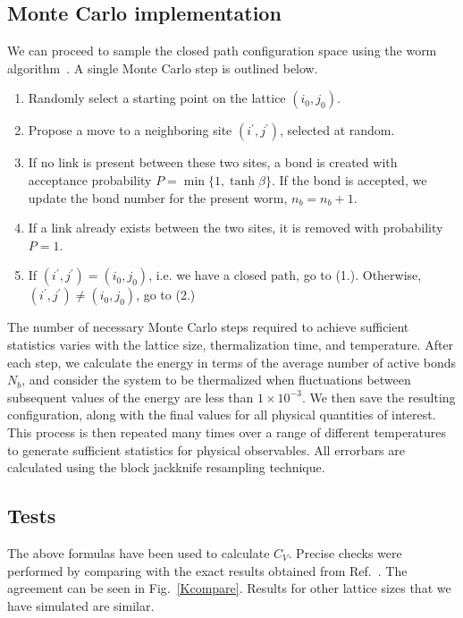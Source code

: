 \documentclass[../main.tex]{subfiles}
\begin{document}
\subsection{Monte Carlo implementation}%
\label{ssec:monte_carlo_implementation}
We can proceed to sample the closed path configuration space using the worm algorithm~\cite{prok87}. A single Monte
Carlo step is outlined below.
\begin{enumerate}
    \item Randomly select a starting point on the lattice $(i_0, j_0)$.
    \item Propose a move to a neighboring site $(i^{\prime}, j^{\prime})$,
        selected at random.
    \item If no link is present between these two sites, a bond is created with
        acceptance probability $P = \min\{1, \tanh{\beta}\}$. If the bond is
        accepted, we update the bond number for the present worm, $n_b = n_b +
        1$.
    \item If a link already exists between the two sites, it is removed with
        probability $P = 1$.
    \item If $(i^{\prime}, j^{\prime}) = (i_0, j_0)$, i.e. we have a closed
        path, go to (1.). Otherwise, $(i^{\prime}, j^{\prime}) \neq (i_0,
        j_0)$, go to (2.)
\end{enumerate}
The number of necessary Monte Carlo steps required to achieve sufficient statistics varies with the lattice size,
thermalization time, and temperature.  After each step, we calculate the energy in terms of the average number of
active bonds $N_b$, and consider the system to be thermalized when fluctuations between subsequent values of the energy
are less than $1\times10^{-3}$. We then save the resulting configuration, along with the final values for all physical
quantities of interest. This process is then repeated many times over a range of different temperatures to generate
sufficient statistics for physical observables. All errorbars are calculated using the block jackknife resampling
technique. 
%
\subsection{Tests}%
\label{ssec:tests}
The above formulas have been used to calculate $C_V$.  Precise checks were performed by comparing with the exact
results obtained from Ref.~\cite{bkaufman}. The agreement  can be seen in Fig.~\ref{Kcompare}.  Results for other
lattice sizes that we have simulated are similar.
\end{document}
